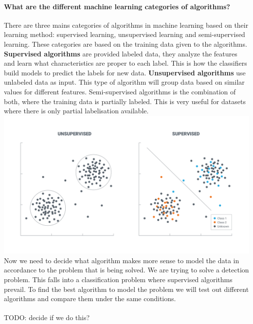 \paragraph{What are the different machine learning categories of algorithms?}
There are three mains categories of algorithms in machine learning based on their learning method: supervised learning, unsupervised learning and semi-supervised learning.
These categories are based on the training data given to the algorithms. \textbf{Supervised algorithms} are provided labeled data, they analyze the features and learn what characteristics are proper to each label. This is how the classifiers build models to predict the labels for new data.
\textbf{Unsupervised algorithms} use unlabeled data as input. This type of algorithm will group data based on similar values for different features.
Semi-supervised algorithms is the combination of both, where the training data is partially labeled. This is very useful for datasets where there is only partial labelisation available.
\\
\includegraphics[scale=.3]{img/supVsUnsup.png}
\cite{supvsunsup}
Now we need to decide what algorithm makes more sense to model the data in accordance to the problem that is being solved. We are trying to solve a detection problem. This  falls into a classification problem where supervised algorithms prevail\cite{supvsunsup2}. To find the best algorithm to model the problem we will test out different algorithms and compare them under the same conditions.\\
\\
TODO: decide if we do this?

